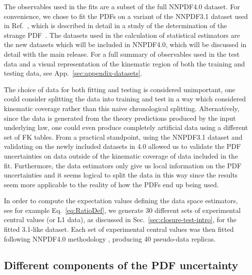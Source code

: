 The observables used in the fits are a subset of the full NNPDF4.0 dataset. For
convenience, we chose to fit the PDFs on a variant of the NNPDF3.1 dataset used
in Ref.~\cite{Ball_2018}, which is described in detail in a study of the
determination of the strange PDF~\cite{Faura_2020}. 
The datasets used in the
calculation of statistical estimators are the new datasets which will be
included in NNPDF4.0, which will be discussed in detail with the main release.
For a full summary of observables used in the test data and a visual
representation of the kinematic region of both the training and testing data,
see App.~\ref{sec:appendix-datasets}.

The choice of data for both fitting and testing is considered unimportant, one
could consider splitting the data into training and test in a way which
considered kinematic coverage rather than this naive chronological splitting.
Alternatively, since the data is generated from the theory predictions produced
by the input underlying law, one could even produce completely artificial data
using a different set of FK tables. From a practical standpoint, using the
NNPDF3.1 dataset and validating on the newly included datasets in 4.0 allowed us
to validate the PDF uncertainties on data outside of the kinematic coverage of
data included in the fit. Furthermore, the data estimators only give us local
information on the PDF uncertainties and it seems logical to split the data in
this way since the results seem more applicable to the reality of how the PDFs
end up being used.

In order to compute the expectation values defining the data space estimators,
see for example Eq.~\eqref{eq:RatioDef}, we generate 30 different sets of experimental central values (or L1 data),
as discussed in Sec.~\ref{sec:closure-test-intro}, for the fitted 3.1-like
dataset. Each set of experimental central values was then fitted following
NNPDF4.0 methodology \cite{NNPDF40}, producing 40 pseudo-data replicas.


\subsection{Different components of the PDF uncertainty}

